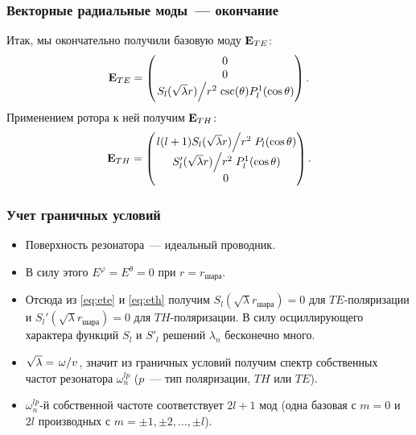 \documentclass[compress]{beamer}
\begin{document}
    \begin{frame}\frametitle{Векторные радиальные моды~--- окончание}

        Итак, мы окончательно получили базовую моду $\vb{E}_{TE}$:
        \begin{equation}\label{eq:ete}
            \vb{E}_{TE} = \begin{pmatrix}
                0 \\ 0 \\ \flatfrac{S_l(\sqrt\lambda r)}{r^2} \csc(\theta) P^1_l(\cos\theta)
            \end{pmatrix} .
        \end{equation}
        Применением ротора к ней получим $\vb{E}_{TH}$:
        \begin{equation}\label{eq:eth}
            \vb{E}_{TH} = \begin{pmatrix}
                \flatfrac{l(l+1) S_l(\sqrt\lambda r)}{r^2} P_l(\cos\theta) \\
                \flatfrac{S_l'(\sqrt\lambda r)}{r^2} P_l^1(\cos\theta) \\
                0
            \end{pmatrix} .
        \end{equation}

    \end{frame}


    \begin{frame}\frametitle{Учет граничных условий}

        \begin{itemize}
            \item Поверхность резонатора~--- идеальный проводник.

            \item В силу этого $E^\varphi = E^\theta = 0$ при $r = r_\text{шара}$.

            \item Отсюда из \autoref{eq:ete} и \autoref{eq:eth} получим $S_l(\sqrt\lambda r_\text{шара}) = 0$ для $TE$-поляризации и $S_l'(\sqrt\lambda r_\text{шара}) = 0$ для $TH$-поляризации. В силу осциллирующего характера функций $S_l$ и $S'_l$ решений $\lambda_n$ бесконечно много.

            \item $\sqrt\lambda = \flatfrac{\omega}{v}$, значит из граничных условий получим спектр собственных частот резонатора $\omega^{lp}_n$ ($p$~--- тип поляризации, $TH$ или $TE$).

            \item $\omega^{lp}_n$-й собственной частоте соответствует $2l + 1$ мод (одна базовая с $m = 0$ и $2l$ производных с $m = \pm 1, \pm 2, \dots, \pm l$).
        \end{itemize}

    \end{frame}
\end{document}
